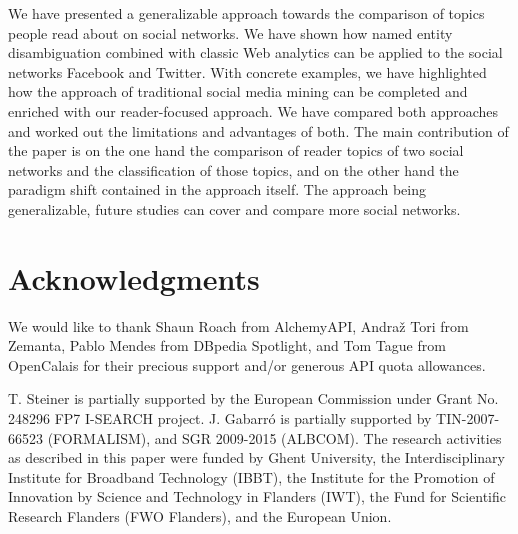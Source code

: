 \documentclass{iosart2c}
\begin{document}
We have presented a generalizable approach towards the comparison of topics people read about on social networks.
We have shown how named entity disambiguation combined with classic Web analytics can be applied to the social networks Facebook and Twitter.
With concrete examples, we have highlighted how the approach of traditional social media mining can be completed and enriched with our reader-focused approach.
We have compared both approaches and worked out the limitations and advantages of both.
The main contribution of the paper is on the one hand the comparison of reader topics of two social networks and the classification of those topics, and on the other hand the paradigm shift contained in the approach itself.
The approach being generalizable, future studies can cover and compare more social networks.

\section*{Acknowledgments}
We would like to thank Shaun Roach from AlchemyAPI, Andraž Tori from Zemanta, Pablo Mendes from DBpedia Spotlight, and Tom Tague from OpenCalais for their precious support and/or generous API quota allowances. 

T. Steiner is partially supported by the European Commission under Grant No. 248296 FP7 I-SEARCH project.
J. Gabarr\'o is partially supported by TIN-2007-66523 (FORMALISM), and SGR 2009-2015 (ALBCOM).
The research activities as described in this paper were funded by Ghent University, the Interdisciplinary Institute for Broadband Technology (IBBT), the Institute for the Promotion of Innovation by Science and Technology in Flanders (IWT), the Fund for Scientific Research Flanders (FWO Flanders), and the European Union.



\end{document}
